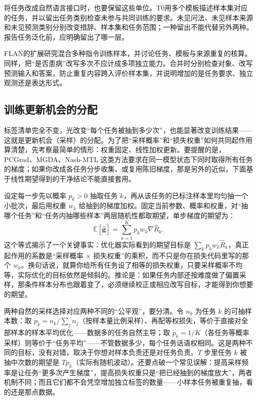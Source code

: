 将任务改成自然语言接口时，也要保留这些单位。T0用多个模板描述样本集对应的任务，并以留出任务类别检查未参与共同训练的要求。未见问法、未见样本来源和未见预测类别分别改变措辞、样本集和任务范围；一种留出不能代替另外两种。报告任务泛化前，应明确留出了哪一层。

FLAN的扩展研究混合多种指令训练样本，并讨论任务、模板与来源重复的核算。同样，把“是否患病”改写多次不应计成多项独立能力。合并时分别检查对象、改写预测输入和答案，防止重复内容跨入评价样本集，并说明增加的是任务要求、独立观测还是表达形式。

\subsection{训练更新机会的分配}
\label{sec:ket-sharing-sampling}

标签清单完全不变，光改变“每个任务被抽到多少次”，也能显著改变训练结果——这就是更新机会（采样）的分配。为了把“采样概率”和“损失权重”如何共同起作⽤算清楚，先考察最简单的情形：权重固定、线性加权更新。要提醒的是，PCGrad、MGDA、Nash-MTL 这类方法要求在同一模型状态下同时取得所有任务的梯度；如果你改成各任务分步收集、或复用陈旧梯度，那是另外的近似，下面基于线性期望得到的干净结论不能直接套用。

设定每一步先以概率 $p_k>0$ 抽取任务 $k$，再从该任务的已标注样本里均匀抽一个小批次，最后用权重 $w_k$ 给抽到的梯度加权。固定当前参数、概率和权重，对“抽哪个任务”和“任务内抽哪些样本”两层随机性都取期望，单步梯度的期望为：
\begin{equation}
  \mathbb E[\widehat{\bm g}]
  =\sum_{k=1}^{K}p_kw_k
    \nabla\hat R_k.
  \label{eq:ket-sharing-effective-objective}
\end{equation}
这个等式揭示了一个关键事实：优化器实际看到的期望目标是 $\sum_k p_kw_k\hat R_k$，真正起作用的系数是“采样概率 × 损失权重”的乘积，而不只是你在损失代码里写的那个 $w_k$。换句话说，就算你给所有任务设了相等的损失权重，只要采样概率不均等，实际优化的目标依然是倾斜的。推论是：如果任务内部还按难度做了偏置采样，那条件样本分布也跟着变了，必须继续校正或相应改写目标，才能得到你想要的期望。

两种自然的采样选择对应两种不同的“公平观”，要分清。令 $n_k$ 为任务 $k$ 的可抽样本数：取 $p_k=n_k/\sum_j n_j$（按样本量比例采样）、再配等权损失，等价于直接对全部样本的样本平均优化——数据多的任务自然主导；取 $p_k=1/K$（各任务等概率采样）则等价于“任务平均”——不管数据多少，每个任务话语权相同。这是两种不同的目标，没有对错，取决于你想对样本负责还是对任务负责。$T$ 步里任务 $k$ 被抽中次数的期望是 $Tp_k$（实际有随机波动）。还要点破一个常见误解：提高采样频率是让任务“更多次产生梯度”，提高损失权重只是“把已经抽到的梯度放大”，两者机制不同；而且它们都不会凭空增加独立标签的数量——小样本任务被重复抽，看的还是那点数据。

